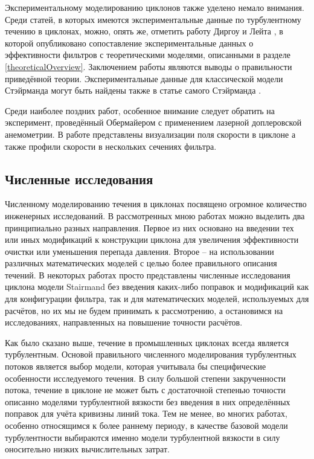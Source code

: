 		Экспериментальному моделированию циклонов также уделено немало внимания. Среди статей, в которых имеются экспериментальные данные по турбулентному течению в циклонах, можно, опять же, отметить работу Диргоу и Лейта \cite{DirgoLeith}, в которой опубликовано сопоставление  экспериментальные данных о эффективности фильтров с теоретическими моделями, описанными в разделе \ref{theoreticalOverview}. Заключением работы являются выводы о правильности приведённой теории. Экспериментальные данные для классической модели Стэйрманда могут быть найдены также в статье самого Стэйрманда \cite{Stairmand}. 
		
		Среди наиболее поздних работ, особенное внимание следует обратить на эксперимент, проведённый Обермайером \cite{Obermaier} с применением лазерной доплеровской анемометрии. В работе представлены визуализации поля скорости в циклоне а также профили скорости в нескольких сечениях фильтра.
	\subsection{Численные исследования}
Численному моделированию течения в циклонах посвящено огромное количество инженерных исследований. В рассмотренных мною работах можно выделить два принципиально разных направления. Первое из них основано на введении тех или иных модификаций к конструкции циклона для увеличения эффективности очистки или уменьшения перепада давления. Второе -- на использовании различных математических моделей с целью более правильного описания течений. В некоторых работах просто представлены численные исследования циклона модели Stairmand без введения каких-либо поправок и модификаций как для конфигурации фильтра, так и для математических моделей, используемых для расчётов, но их мы не будем принимать к рассмотрению, а остановимся на исследованиях, направленных на повышение точности расчётов.
		
	Как было сказано выше, течение в промышленных циклонах всегда является турбулентным. Основой правильного численного моделирования турбулентных потоков является выбор модели, которая учитывала бы специфические особенности исследуемого течения. В силу большой степени закрученности потока, течение в циклоне не может быть с достаточной степенью точности описанно моделями турбулентной вязкости без введения в них определённых поправок для учёта кривизны линий тока. Тем не менее, во многих работах, особенно относящимся к более раннему периоду, в качестве базовой модели турбулентности выбираются именно модели турбулентной вязкости в силу оносительно низких вычислительных затрат.
	
